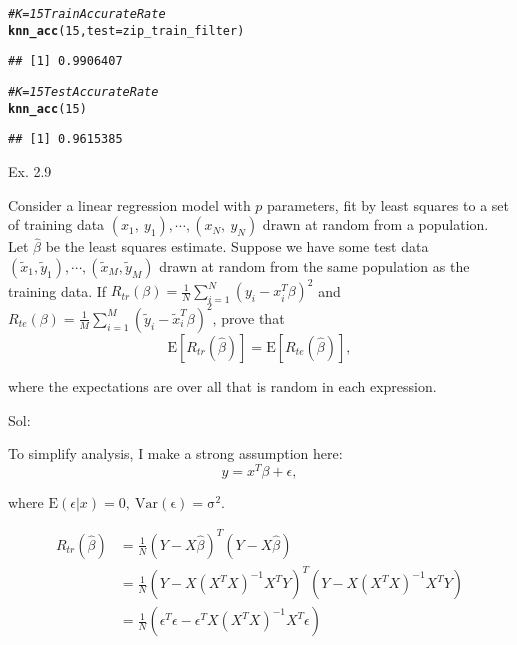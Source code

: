 \documentclass[english]{article}\usepackage[]{graphicx}\usepackage[]{color}
\makeatletter
\newcommand{\hlnum}[1]{\textcolor[rgb]{0.686,0.059,0.569}{#1}}%
\newcommand{\hlcom}[1]{\textcolor[rgb]{0.678,0.584,0.686}{\textit{#1}}}%
\newcommand{\hlstd}[1]{\textcolor[rgb]{0.345,0.345,0.345}{#1}}%
\newcommand{\hlkwc}[1]{\textcolor[rgb]{0.333,0.667,0.333}{#1}}%
\newcommand{\hlkwd}[1]{\textcolor[rgb]{0.737,0.353,0.396}{\textbf{#1}}}%
\newenvironment{kframe}{%
 \def\at@end@of@kframe{}%
 \ifinner\ifhmode%
  \def\at@end@of@kframe{\end{minipage}}%
  \begin{minipage}{\columnwidth}%
 \fi\fi%
 \def\FrameCommand##1{\hskip\@totalleftmargin \hskip-\fboxsep
 \colorbox{shadecolor}{##1}\hskip-\fboxsep
     \hskip-\linewidth \hskip-\@totalleftmargin \hskip\columnwidth}%
 \MakeFramed {\advance\hsize-\width
   \@totalleftmargin\z@ \linewidth\hsize
   \@setminipage}}%
 {\par\unskip\endMakeFramed%
 \at@end@of@kframe}
\newenvironment{knitrout}{}{} %
\makeatother
\begin{document}
\begin{knitrout}
\begin{kframe}
\begin{alltt}
\hlcom{# K = 15 Train Accurate Rate}
\hlkwd{knn_acc}\hlstd{(}\hlnum{15}\hlstd{,} \hlkwc{test} \hlstd{= zip_train_filter)}
\end{alltt}
\begin{verbatim}
## [1] 0.9906407
\end{verbatim}
\begin{alltt}
\hlcom{# K = 15 Test Accurate Rate}
\hlkwd{knn_acc}\hlstd{(}\hlnum{15}\hlstd{)}
\end{alltt}
\begin{verbatim}
## [1] 0.9615385
\end{verbatim}
\end{kframe}
\end{knitrout}

\vspace{0.5cm}

Ex. 2.9

\vspace{0.5cm}

Consider a linear regression model with $p$ parameters, fit by least
squares to a set of training data $(x_{1},\ y_{1}),\cdots,(x_{N},\ y_{N})$
drawn at random from a population. Let $\hat{\beta}$ be the least
squares estimate. Suppose we have some test data $(\tilde{x}_{1},\tilde{y}_{1}),\cdots,(\tilde{x}_{M},\tilde{y}_{M})$
drawn at random from the same population as the training data. If
$R_{tr}(\beta)=\frac{1}{N}\sum_{i=1}^{N}(y_{i}-x_{i}^{T}\beta)^{2}$
and $R_{te}(\beta)=\frac{1}{M}\sum_{i=1}^{M}(\tilde{y}_{i}-\tilde{x}_{i}^{T}\beta)^{2}$,
prove that 
\[
\mathrm{E}[R_{tr}(\hat{\beta})]=\mathrm{E}[R_{te}(\hat{\beta})],
\]

where the expectations are over all that is random in each expression. 

\vspace{0.5cm}

Sol:

To simplify analysis, I make a strong assumption here:
\[
y=x^{T}\beta+\epsilon,
\]

where $\mathrm{E}(\epsilon|x)=0,\ \mathrm{Var(\epsilon)=\sigma^{2}}$.

\begin{align*}
R_{tr}(\hat{\beta}) & =\frac{1}{N}(Y-X\hat{\beta})^{T}(Y-X\hat{\beta})\\
 & =\frac{1}{N}(Y-X(X^{T}X)^{-1}X^{T}Y)^{T}(Y-X(X^{T}X)^{-1}X^{T}Y)\\
 & =\frac{1}{N}(\epsilon^{T}\epsilon-\epsilon^{T}X(X^{T}X)^{-1}X^{T}\epsilon)
\end{align*}
\end{document}
